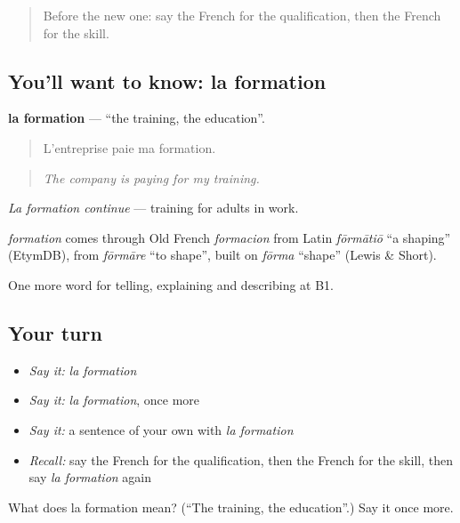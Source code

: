 \label{lesson:FR-C360-formation}



\begin{quote}
Before the new one: say the French for the qualification, then the French for the skill.
\end{quote}

\subsection*{You'll want to know: la formation}
\textbf{la formation} — \textquotedblleft{}the training, the education\textquotedblright{}.

\begin{quote}
L'entreprise paie ma formation.
\end{quote}

\begin{quote}
\emph{The company is paying for my training.}
\end{quote}

\emph{La formation continue} — training for adults in work.

\begin{cousinweb}
\emph{formation} comes through Old French \emph{formacion} from Latin \emph{fōrmātiō} \textquotedblleft{}a shaping\textquotedblright{} (EtymDB), from \emph{fōrmāre} \textquotedblleft{}to shape\textquotedblright{}, built on \emph{fōrma} \textquotedblleft{}shape\textquotedblright{} (Lewis \& Short).
\end{cousinweb}

\begin{grammarlens}[title={What you've built}]
One more word for telling, explaining and describing at B1.
\end{grammarlens}

\subsection*{Your turn}
\begin{itemize}
\raggedright
  \item \emph{Say it:} \emph{la formation}
  \item \emph{Say it:} \emph{la formation}, once more
  \item \emph{Say it:} a sentence of your own with \emph{la formation}
  \item \emph{Recall:} say the French for the qualification, then the French for the skill, then say \emph{la formation} again
\end{itemize}

\begin{tcolorbox}[breakable,colback=teal!4,colframe=teal!35!black,title={Before you move on}]
What does la formation mean? (\textquotedblleft{}The training, the education\textquotedblright{}.) Say it once more.
\end{tcolorbox}
